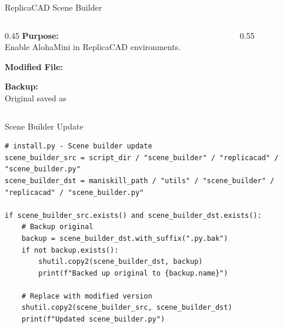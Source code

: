 \documentclass[aspectratio=169]{beamer}
\begin{document}
\begin{frame}{ReplicaCAD Scene Builder}
\begin{columns}
\begin{column}{0.45\textwidth}
    \textbf{Purpose:}\\
    Enable AlohaMini in ReplicaCAD environments.

    \vspace{0.3cm}

    \textbf{Modified File:}\\

    \vspace{0.3cm}

    \textbf{Backup:}\\
    Original saved as 
\end{column}
\begin{column}{0.55\textwidth}
    \centering
\end{column}
\end{columns}
\end{frame}

\begin{frame}[fragile]{Scene Builder Update}
\begin{lstlisting}[basicstyle=\ttfamily\scriptsize]
# install.py - Scene builder update
scene_builder_src = script_dir / "scene_builder" / "replicacad" / "scene_builder.py"
scene_builder_dst = maniskill_path / "utils" / "scene_builder" / "replicacad" / "scene_builder.py"

if scene_builder_src.exists() and scene_builder_dst.exists():
    # Backup original
    backup = scene_builder_dst.with_suffix(".py.bak")
    if not backup.exists():
        shutil.copy2(scene_builder_dst, backup)
        print(f"Backed up original to {backup.name}")

    # Replace with modified version
    shutil.copy2(scene_builder_src, scene_builder_dst)
    print(f"Updated scene_builder.py")
\end{lstlisting}
\end{frame}
\end{document}
